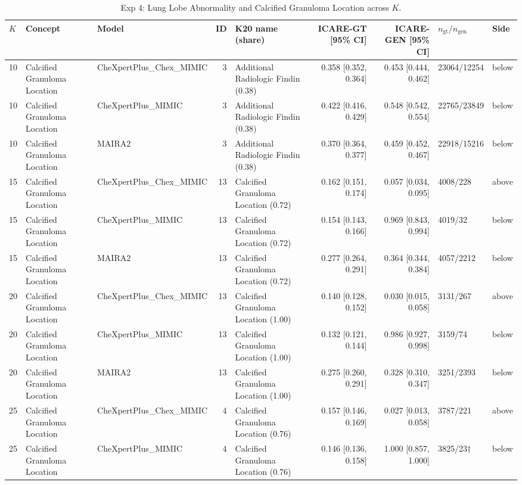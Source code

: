 \begin{table}[t]
\centering
\footnotesize
\caption{Exp 4: Lung Lobe Abnormality and Calcified Granuloma Location across $K$.}
\label{tab:supp_exp4_part2}
\begin{tabular}{lllrlrrll}
\toprule
$K$ & Concept & Model & ID & K20 name (share) & ICARE-GT [95\% CI] & ICARE-GEN [95\% CI] & $n_{\mathrm{gt}}/n_{\mathrm{gen}}$ & Side \\
\midrule
10 & Calcified Granuloma Location & CheXpertPlus\_Chex\_MIMIC & 3 & Additional Radiologic Findin (0.38) & 0.358 [0.352, 0.364] & 0.453 [0.444, 0.462] & 23064/12254 & below \\
10 & Calcified Granuloma Location & CheXpertPlus\_MIMIC & 3 & Additional Radiologic Findin (0.38) & 0.422 [0.416, 0.429] & 0.548 [0.542, 0.554] & 22765/23849 & below \\
10 & Calcified Granuloma Location & MAIRA2 & 3 & Additional Radiologic Findin (0.38) & 0.370 [0.364, 0.377] & 0.459 [0.452, 0.467] & 22918/15216 & below \\
15 & Calcified Granuloma Location & CheXpertPlus\_Chex\_MIMIC & 13 & Calcified Granuloma Location (0.72) & 0.162 [0.151, 0.174] & 0.057 [0.034, 0.095] & 4008/228 & above \\
15 & Calcified Granuloma Location & CheXpertPlus\_MIMIC & 13 & Calcified Granuloma Location (0.72) & 0.154 [0.143, 0.166] & 0.969 [0.843, 0.994] & 4019/32 & below \\
15 & Calcified Granuloma Location & MAIRA2 & 13 & Calcified Granuloma Location (0.72) & 0.277 [0.264, 0.291] & 0.364 [0.344, 0.384] & 4057/2212 & below \\
20 & Calcified Granuloma Location & CheXpertPlus\_Chex\_MIMIC & 13 & Calcified Granuloma Location (1.00) & 0.140 [0.128, 0.152] & 0.030 [0.015, 0.058] & 3131/267 & above \\
20 & Calcified Granuloma Location & CheXpertPlus\_MIMIC & 13 & Calcified Granuloma Location (1.00) & 0.132 [0.121, 0.144] & 0.986 [0.927, 0.998] & 3159/74 & below \\
20 & Calcified Granuloma Location & MAIRA2 & 13 & Calcified Granuloma Location (1.00) & 0.275 [0.260, 0.291] & 0.328 [0.310, 0.347] & 3251/2393 & below \\
25 & Calcified Granuloma Location & CheXpertPlus\_Chex\_MIMIC & 4 & Calcified Granuloma Location (0.76) & 0.157 [0.146, 0.169] & 0.027 [0.013, 0.058] & 3787/221 & above \\
25 & Calcified Granuloma Location & CheXpertPlus\_MIMIC & 4 & Calcified Granuloma Location (0.76) & 0.146 [0.136, 0.158] & 1.000 [0.857, 1.000] & 3825/23† & below \\

\end{tabular}
\end{table}
